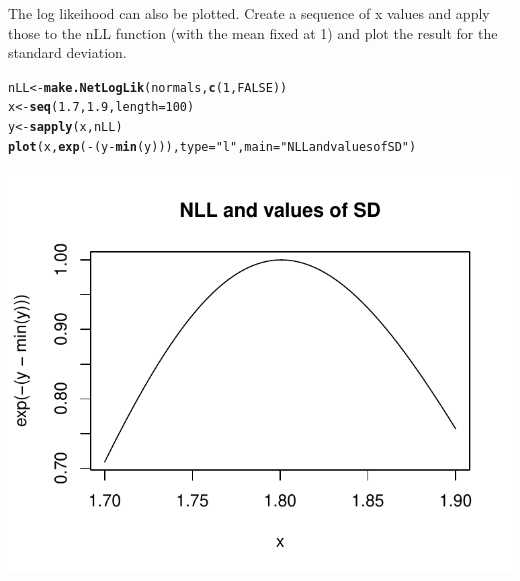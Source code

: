 \documentclass{article}\usepackage{graphicx, color}
\makeatletter
\def\maxwidth{ %
  \ifdim\Gin@nat@width>\linewidth
    \linewidth
  \else
    \Gin@nat@width
  \fi
}
\newcommand{\hlfunctioncall}[1]{\textcolor[rgb]{0.501960784313725,0,0.329411764705882}{\textbf{#1}}}%
\newcommand{\hlstring}[1]{\textcolor[rgb]{0.6,0.6,1}{#1}}%
\newenvironment{kframe}{%
 \def\at@end@of@kframe{}%
 \ifinner\ifhmode%
  \def\at@end@of@kframe{\end{minipage}}%
  \begin{minipage}{\columnwidth}%
 \fi\fi%
 \def\FrameCommand##1{\hskip\@totalleftmargin \hskip-\fboxsep
 \colorbox{shadecolor}{##1}\hskip-\fboxsep
     \hskip-\linewidth \hskip-\@totalleftmargin \hskip\columnwidth}%
 \MakeFramed {\advance\hsize-\width
   \@totalleftmargin\z@ \linewidth\hsize
   \@setminipage}}%
 {\par\unskip\endMakeFramed%
 \at@end@of@kframe}
\newenvironment{knitrout}{}{} %
\makeatother
\begin{document}
The log likeihood can also be plotted.  Create a sequence of x values and apply those to the nLL function (with the mean fixed at 1) and plot the result for the standard deviation.  
\begin{knitrout}
\color{fgcolor}\begin{kframe}
\begin{alltt}
nLL <- \hlfunctioncall{make.NetLogLik}(normals, \hlfunctioncall{c}(1, FALSE))
x <- \hlfunctioncall{seq}(1.7, 1.9, length = 100)
y <- \hlfunctioncall{sapply}(x, nLL)
\hlfunctioncall{plot}(x, \hlfunctioncall{exp}(-(y - \hlfunctioncall{min}(y))), type = \hlstring{"l"}, main = \hlstring{"NLL and values of SD"})
\end{alltt}
\end{kframe}
\includegraphics[width=\maxwidth]{figure/plotllsd} 

\end{knitrout}
\end{document}
